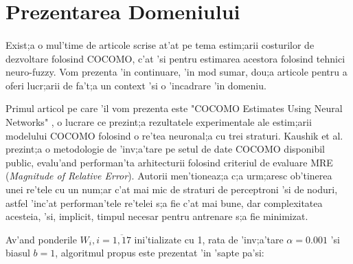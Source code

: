 \section{Prezentarea Domeniului}

\paragraph{}

\par
Exist;a o mul'time de articole scrise at'at pe tema estim;arii costurilor de dezvoltare folosind COCOMO, c'at 'si pentru estimarea acestora folosind tehnici neuro-fuzzy. Vom prezenta 'in continuare, 'in mod sumar, dou;a articole pentru a oferi lucr;arii de fa't;a un context 'si o 'incadrare 'in domeniu.
\par
Primul articol pe care 'il vom prezenta este "COCOMO Estimates Using Neural Networks" \cite{cocomoneuralnets}, o lucrare ce prezint;a rezultatele experimentale ale estim;arii modelului COCOMO folosind o re'tea neuronal;a cu trei straturi. Kaushik et al. prezint;a o metodologie de 'inv;a'tare pe setul de date COCOMO disponibil public, evalu'and performan'ta arhitecturii folosind criteriul de evaluare MRE (\textit{Magnitude of Relative Error}). Autorii men'tioneaz;a c;a urm;aresc ob'tinerea unei re'tele cu un num;ar c'at mai mic de straturi de perceptroni 'si de noduri, astfel 'inc'at performan'tele re'telei s;a fie c'at mai bune, dar complexitatea acesteia, 'si, implicit, timpul necesar pentru antrenare s;a fie minimizat.
\par
Av'and ponderile $W_{i}, i = \overline{1, 17}$ ini'tializate cu 1, rata de 'inv;a'tare $\alpha = 0.001$ 'si biasul $b = 1$, algoritmul propus este prezentat 'in 'sapte pa'si:
